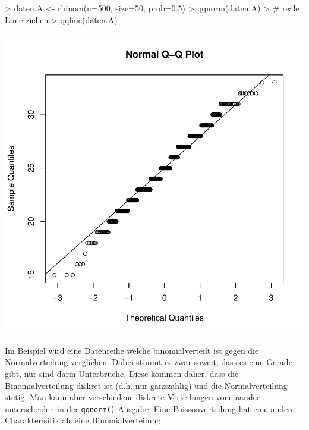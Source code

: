 \begin{Schunk}
\begin{Sinput}
> daten.A <- rbinom(n=500, size=50, prob=0.5)
> qqnorm(daten.A)
> # reale Linie ziehen 
> qqline(daten.A)
\end{Sinput}
\end{Schunk}
\includegraphics{definitionen-029}

\noindent
Im Beispiel wird eine Datenreihe welche binomialverteilt ist gegen
die Normalverteilung verglichen. Dabei stimmt es zwar soweit, dass
es eine Gerade gibt, nur sind darin Unterbrüche. Diese kommen daher, 
dass die Binomialverteilung diskret ist (d.h. nur ganzzahlig) und
die Normalverteilung stetig. Man kann aber verschiedene diskrete
Verteilungen voneinander unterscheiden in der \verb!qqnorm()!-Ausgabe.
Eine Poissonverteilung hat eine andere Charakterisitik als eine
Binomialverteilung.

